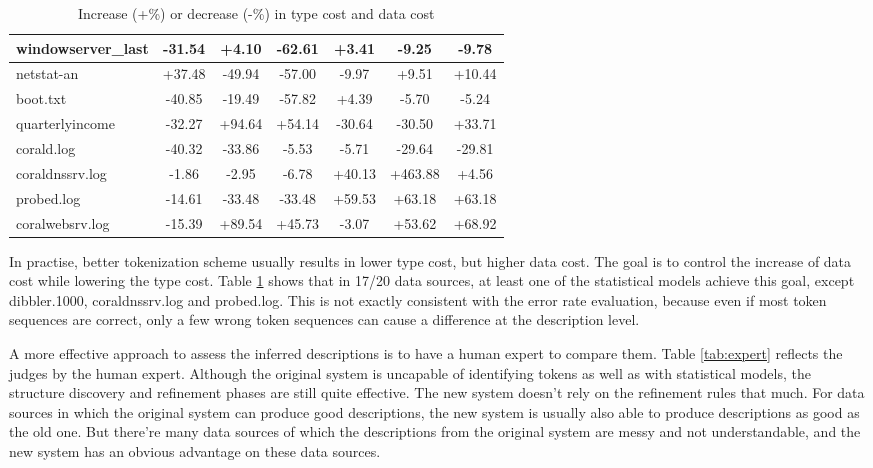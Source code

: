 \begin{table}
\begin{center}
\begin{tabular}{|l||c|c|c||c|c|c|}
windowserver\_last & -31.54 & +4.10 & -62.61 & +3.41 & -9.25 & -9.78  \\ \hline
netstat-an & +37.48 & -49.94 & -57.00 & -9.97 & +9.51 & +10.44 \\ \hline
boot.txt & -40.85 & -19.49 & -57.82 & +4.39 & -5.70 & -5.24 \\ \hline
quarterlyincome & -32.27 & +94.64 & +54.14 & -30.64 & -30.50 & +33.71    \\ \hline
corald.log & -40.32 & -33.86 & -5.53 & -5.71 & -29.64 & -29.81   \\ \hline
coraldnssrv.log  & -1.86 & -2.95 & -6.78 & +40.13 & +463.88 & +4.56 \\ \hline
probed.log & -14.61 & -33.48 & -33.48 & +59.53 & +63.18 & +63.18 \\ \hline
coralwebsrv.log & -15.39 & +89.54 & +45.73 & -3.07 & +53.62 & +68.92   \\
               \hline
\end{tabular}
\caption{Increase (+\%) or decrease (-\%) in type cost and data cost}
\label{tab:complexity}
\end{center}
\end{table}

In practise, better tokenization scheme usually results in lower
type cost, but higher data cost. The goal is to control the increase
of data cost while lowering the type cost. Table \ref{tab:complexity}
shows that in 17/20 data sources, at least one of the statistical
models achieve this goal, except dibbler.1000, coraldnssrv.log and
probed.log. This is not exactly consistent with the error rate
evaluation, because even if most token sequences are correct, only a
few wrong token sequences can cause a difference at the description
level.

A more effective approach to assess the inferred descriptions is to
have a human expert to compare them. Table \ref{tab:expert} reflects
the judges by the human expert. Although the original \learnpads{}
system is uncapable of identifying tokens as well as \learnpads{} with
statistical models, the structure discovery and refinement phases are
still quite effective. The new \learnpads{} system doesn't rely on the
refinement rules that much. For data sources in which the original
system can produce good descriptions, the new system is usually also
able to produce descriptions as good as the old one. But there're many 
data sources of which the descriptions from the original system are
messy and not understandable, and the new system has an obvious advantage
on these data sources. 

